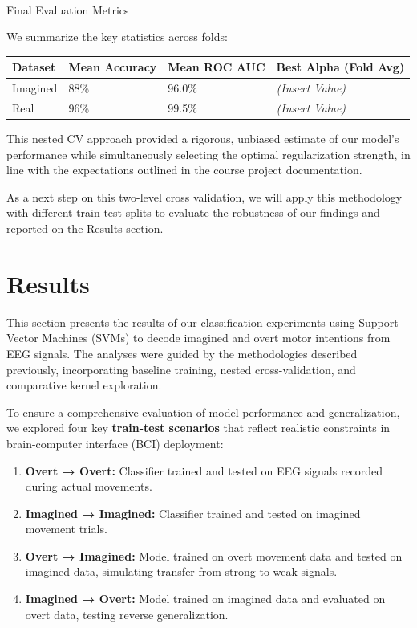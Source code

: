 \documentclass[
  letterpaper,
  DIV=11,
  numbers=noendperiod]{scrartcl}
\makeatletter
\let\oldparagraph\paragraph
\renewcommand{\paragraph}{
    \@ifstar
      \xxxParagraphStar
      \xxxParagraphNoStar
  }
\newcommand{\xxxParagraphStar}[1]{\oldparagraph*{#1}\mbox{}}
\newcommand{\xxxParagraphNoStar}[1]{\oldparagraph{#1}\mbox{}}
\providecommand{\tightlist}{%
  \setlength{\itemsep}{0pt}\setlength{\parskip}{0pt}}\usepackage{longtable,booktabs,array}
\makeatother
\begin{document}
\paragraph{Final Evaluation Metrics}\label{final-evaluation-metrics}

We summarize the key statistics across folds:

\begin{longtable}[]{@{}llll@{}}
\toprule\noalign{}
Dataset & Mean Accuracy & Mean ROC AUC & Best Alpha (Fold Avg) \\
\midrule\noalign{}
\endhead
\bottomrule\noalign{}
\endlastfoot
Imagined & 88\% & 96.0\% & \emph{(Insert Value)} \\
Real & 96\% & 99.5\% & \emph{(Insert Value)} \\
\end{longtable}

This nested CV approach provided a rigorous, unbiased estimate of our
model's performance while simultaneously selecting the optimal
regularization strength, in line with the expectations outlined in the
course project documentation.

As a next step on this two-level cross validation, we will apply this
methodology with different train-test splits to evaluate the robustness
of our findings and reported on the \hyperref[sec-results]{Results
section}.

\section{Results}\label{sec-results}

This section presents the results of our classification experiments
using Support Vector Machines (SVMs) to decode imagined and overt motor
intentions from EEG signals. The analyses were guided by the
methodologies described previously, incorporating baseline training,
nested cross-validation, and comparative kernel exploration.

To ensure a comprehensive evaluation of model performance and
generalization, we explored four key \textbf{train-test scenarios} that
reflect realistic constraints in brain-computer interface (BCI)
deployment:

\begin{enumerate}
\def\labelenumi{\arabic{enumi}.}
\tightlist
\item
  \textbf{Overt → Overt:} Classifier trained and tested on EEG signals
  recorded during actual movements.
\item
  \textbf{Imagined → Imagined:} Classifier trained and tested on
  imagined movement trials.
\item
  \textbf{Overt → Imagined:} Model trained on overt movement data and
  tested on imagined data, simulating transfer from strong to weak
  signals.
\item
  \textbf{Imagined → Overt:} Model trained on imagined data and
  evaluated on overt data, testing reverse generalization.
\end{enumerate}
\end{document}
